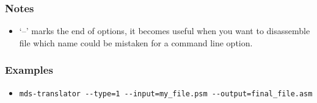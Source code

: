         \subsubsection{Notes}
            \begin{itemize}
                \item `--' marks the end of options, it becomes useful when you want to disassemble file which name could be mistaken for a command line option.
            \end{itemize}

        \subsubsection{Examples}
            \begin{itemize}
                \item \verb'mds-translator --type=1 --input=my_file.psm --output=final_file.asm'\\
            \end{itemize}
